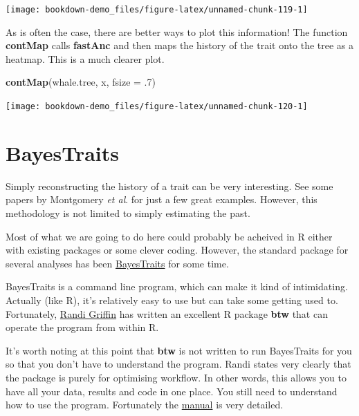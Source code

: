 \documentclass[
]{book}
\newenvironment{Shaded}{\begin{snugshade}}{\end{snugshade}}
\newcommand{\DataTypeTok}[1]{\textcolor[rgb]{0.13,0.29,0.53}{#1}}
\newcommand{\FloatTok}[1]{\textcolor[rgb]{0.00,0.00,0.81}{#1}}
\newcommand{\KeywordTok}[1]{\textcolor[rgb]{0.13,0.29,0.53}{\textbf{#1}}}
\newcommand{\NormalTok}[1]{#1}
\begin{document}
\begin{center}\texttt{[image: bookdown-demo\_files/figure-latex/unnamed-chunk-119-1]} \end{center}

As is often the case, there are better ways to plot this information! The function \textbf{contMap} calls \textbf{fastAnc} and then maps the history of the trait onto the tree as a heatmap. This is a much clearer plot.

\begin{Shaded}
\begin{Highlighting}[]
\KeywordTok{contMap}\NormalTok{(whale.tree, x, }\DataTypeTok{fsize =} \FloatTok{.7}\NormalTok{)}
\end{Highlighting}
\end{Shaded}

\begin{center}\texttt{[image: bookdown-demo\_files/figure-latex/unnamed-chunk-120-1]} \end{center}

\hypertarget{bayestraits}{%
\section{BayesTraits}\label{bayestraits}}

Simply reconstructing the history of a trait can be very interesting. See some papers by Montgomery \emph{et al}. \citetext{\citeyear{Montgomery10}; \citeyear{Montgomery13}} for just a few great examples. However, this methodology is not limited to simply estimating the past.

Most of what we are going to do here could probably be acheived in R either with existing packages or some clever coding. However, the standard package for several analyses has been \href{http://www.evolution.rdg.ac.uk/BayesTraitsV3.0.2/BayesTraitsV3.0.2.html}{BayesTraits} for some time.

BayesTraits is a command line program, which can make it kind of intimidating. Actually (like R), it's relatively easy to use but can take some getting used to. Fortunately, \href{https://www.randigriffin.com/}{Randi Griffin} has written an excellent R package \textbf{btw} that can operate the program from within R.

It's worth noting at this point that \textbf{btw} is not written to run BayesTraits for you so that you don't have to understand the program. Randi states very clearly that the package is purely for optimising workflow. In other words, this allows you to have all your data, results and code in one place. You still need to understand how to use the program. Fortunately the \href{http://www.evolution.rdg.ac.uk/BayesTraitsV3.0.2/Files/BayesTraitsV3.0.2Manual.pdf}{manual} is very detailed.
\end{document}
